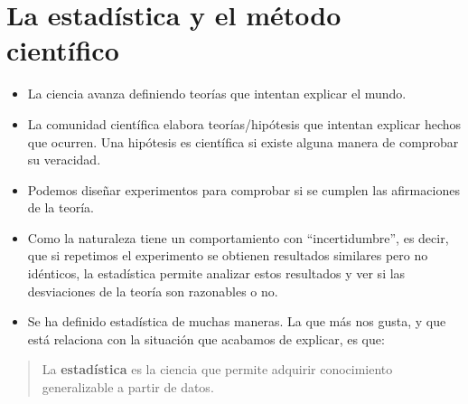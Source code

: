 \documentclass[
  letterpaper,
  DIV=11,
  numbers=noendperiod]{scrreprt}
\begin{document}
\section{La estadística y el método
científico}\label{la-estaduxedstica-y-el-muxe9todo-cientuxedfico}

\begin{itemize}
\item
  La ciencia avanza definiendo teorías que intentan explicar el mundo.
\item
  La comunidad científica elabora teorías/hipótesis que intentan
  explicar hechos que ocurren. Una hipótesis es científica si existe
  alguna manera de comprobar su veracidad.
\item
  Podemos diseñar experimentos para comprobar si se cumplen las
  afirmaciones de la teoría.
\item
  Como la naturaleza tiene un comportamiento con ``incertidumbre'', es
  decir, que si repetimos el experimento se obtienen resultados
  similares pero no idénticos, la estadística permite analizar estos
  resultados y ver si las desviaciones de la teoría son razonables o no.
\item
  Se ha definido estadística de muchas maneras. La que más nos gusta, y
  que está relaciona con la situación que acabamos de explicar, es que:
\end{itemize}

\begin{quote}
La \textbf{estadística} es la ciencia que permite adquirir conocimiento
generalizable a partir de datos.
\end{quote}
\end{document}
